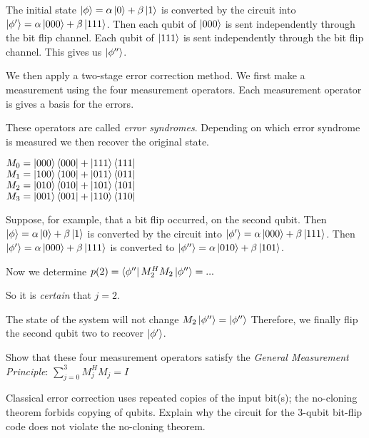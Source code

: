 The initial state $\left|\phi\right\rangle = \alpha \left|0\right\rangle + \beta \left|1\right\rangle$ is converted by
the circuit into $\left|\phi'\right\rangle = \alpha \left|000\right\rangle + \beta \left|111\right\rangle$.
Then each qubit of $\left|000\right\rangle$ is sent independently through the bit flip channel.
Each qubit of $\left|111\right\rangle$ is sent independently through the bit flip channel. 
This gives us $\left|\phi''\right\rangle$.

We then apply a two-stage error correction method. 
We first make a measurement using the four measurement
operators. Each measurement operator is gives a basis for the errors. 

These operators are called \textit{error syndromes}.
Depending on which error syndrome is measured we then recover the original
state.

$M_0 = \left|000\right\rangle\left\langle000\right| + \left|111\right\rangle\left\langle111\right|$ \\
$M_1 = \left|100\right\rangle\left\langle100\right| + \left|011\right\rangle\left\langle011\right|$ \\
$M_2 = \left|010\right\rangle\left\langle010\right| + \left|101\right\rangle\left\langle101\right|$ \\
$M_3 = \left|001\right\rangle\left\langle001\right| + \left|110\right\rangle\left\langle110\right|$ \\



\begin{example}
Suppose, for example, that a bit flip occurred, on the second qubit.
Then $\left|\phi\right\rangle = \alpha \left|0\right\rangle + \beta \left|1\right\rangle$ is converted by
the circuit into $\left|\phi'\right\rangle = \alpha \left|000\right\rangle + \beta \left|111\right\rangle$.
Then $\left|\phi'\right\rangle = \alpha \left|000\right\rangle + \beta \left|111\right\rangle$ is converted to 
$\left|\phi''\right\rangle = \alpha \left|010\right\rangle + \beta \left|101\right\rangle$. 

Now we determine $p(2) = \left\langle\phi''\right| M^{H}_{2} M_{2} \left|\phi''\right\rangle = ...$

\end{example}


So it is \textit{certain} that $j = 2$. 

The state of the system will not change $M_2 \left|\phi''\right\rangle = \left|\phi''\right\rangle$
Therefore, we finally flip the second qubit two to recover $\left|\phi'\right\rangle$.

\frmrule

\begin{example}
Show that these four measurement operators 
satisfy the \textit{General Measurement Principle}: $\sum^{3}_{j=0} M^{H}_{j} M_{j} = I$
\end{example}

\frmrule

\begin{example}
Classical error correction uses repeated copies of the input bit(s); 
the no-cloning theorem forbids copying of qubits. 
Explain why the circuit for the 3-qubit bit-flip code does 
not violate the no-cloning theorem.
\end{example}


